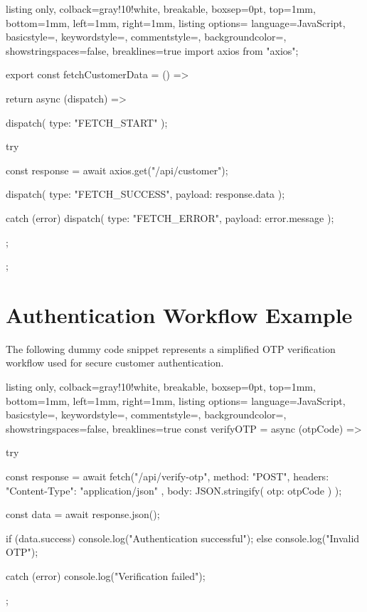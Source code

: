 \begin{tcblisting}{listing only,
    colback=gray!10!white, 
    breakable, 
    boxsep=0pt,
    top=1mm,
    bottom=1mm,
    left=1mm,
    right=1mm,
    listing options={
        language=JavaScript,
        basicstyle=\small\ttfamily,
        keywordstyle=\color{blue},
        commentstyle=\color{gray},
        backgroundcolor=\color{gray!25},
        showstringspaces=false,
        breaklines=true
    }
}
import axios from "axios";

export const fetchCustomerData = () => {
    return async (dispatch) => {
        dispatch({ type: "FETCH_START" });

        try {
            const response = await axios.get("/api/customer");

            dispatch({
                type: "FETCH_SUCCESS",
                payload: response.data
            });
        } catch (error) {
            dispatch({
                type: "FETCH_ERROR",
                payload: error.message
            });
        }
    };
};
\end{tcblisting}

\section{Authentication Workflow Example}

The following dummy code snippet represents a simplified OTP verification workflow used for secure customer authentication.

\begin{tcblisting}{listing only,
    colback=gray!10!white, 
    breakable, 
    boxsep=0pt,
    top=1mm,
    bottom=1mm,
    left=1mm,
    right=1mm,
    listing options={
        language=JavaScript,
        basicstyle=\small\ttfamily,
        keywordstyle=\color{blue},
        commentstyle=\color{gray},
        backgroundcolor=\color{gray!25},
        showstringspaces=false,
        breaklines=true
    }
}
const verifyOTP = async (otpCode) => {
    try {
        const response = await fetch("/api/verify-otp", {
            method: "POST",
            headers: {
                "Content-Type": "application/json"
            },
            body: JSON.stringify({ otp: otpCode })
        });

        const data = await response.json();

        if (data.success) {
            console.log("Authentication successful");
        } else {
            console.log("Invalid OTP");
        }
    } catch (error) {
        console.log("Verification failed");
    }
};
\end{tcblisting}

